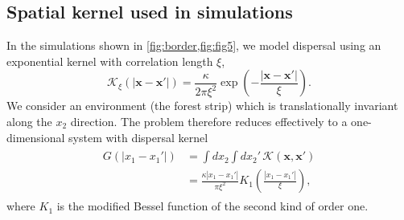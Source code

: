 \documentclass[aps,pre,twocolumn,superscriptaddress,10pt]{revtex4-2}
\begin{document}
\subsection*{Spatial kernel used in simulations}
In the simulations shown in \cref{fig:border,fig:fig5}, we model dispersal using an exponential kernel with correlation length $\xi$,
\begin{equation}
\mathcal K_\xi\!\left(|\mathbf{x}-\mathbf{x}'|\right) = \frac{\kappa}{2\pi \xi^2} \exp\left(-\frac{|\mathbf{x}-\mathbf{x}'|}{\xi} \right).
\label{eq:exp-kernel}
\end{equation}
We consider an environment (the forest strip) which is translationally invariant along the $x_2$ direction. The problem therefore reduces effectively to a one-dimensional system with dispersal kernel
\begin{align}
\begin{split}
G\!\left(|x_1-x_1'|\right) &= \int dx_2 \int dx_2'\, \mathcal K(\mathbf{x},\mathbf{x}') \\
&= \frac{\kappa|x_1-x_1'|}{\pi\xi^2} K_1\!\left(\frac{|x_1-x_1'|}{\xi}\right),
\end{split}
\end{align}
where $K_1$ is the modified Bessel function of the second kind of order one.



\end{document}

